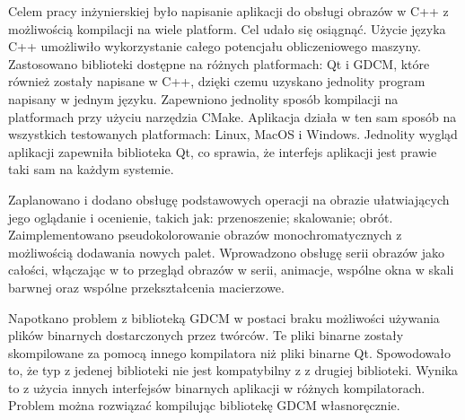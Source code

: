 \par
Celem pracy inżynierskiej było napisanie aplikacji do obsługi obrazów \DICOM w C++ z możliwością kompilacji na wiele platform.
Cel udało się osiągnąć.
Użycie języka C++ umożliwiło wykorzystanie całego potencjału obliczeniowego maszyny.
Zastosowano biblioteki dostępne na różnych platformach: Qt i GDCM, które również zostały napisane w C++, dzięki czemu uzyskano jednolity program napisany w jednym języku.
Zapewniono jednolity sposób kompilacji na platformach przy użyciu narzędzia CMake.
Aplikacja działa w ten sam sposób na wszystkich testowanych platformach: Linux, MacOS i Windows.
Jednolity wygląd aplikacji zapewniła biblioteka Qt, co sprawia, że interfejs aplikacji jest prawie taki sam na każdym systemie.
\par
Zaplanowano i dodano obsługę podstawowych operacji na obrazie ułatwiających jego oglądanie i ocenienie, takich jak: przenoszenie; skalowanie; obrót.
Zaimplementowano pseudokolorowanie obrazów monochromatycznych z możliwością dodawania nowych palet.
Wprowadzono obsługę serii obrazów jako całości, włączając w to przegląd obrazów w serii, animacje, wspólne okna w skali barwnej oraz wspólne przekształcenia macierzowe.
\par
Napotkano problem z biblioteką GDCM w postaci braku możliwości używania plików binarnych dostarczonych przez twórców.
Te pliki binarne zostały skompilowane za pomocą innego kompilatora niż pliki binarne Qt.
Spowodowało to, że typ  z jedenej biblioteki nie jest kompatybilny z  z drugiej biblioteki.
Wynika to z użycia innych interfejsów binarnych aplikacji  w różnych kompilatorach.
Problem można rozwiązać kompilując bibliotekę GDCM własnoręcznie.